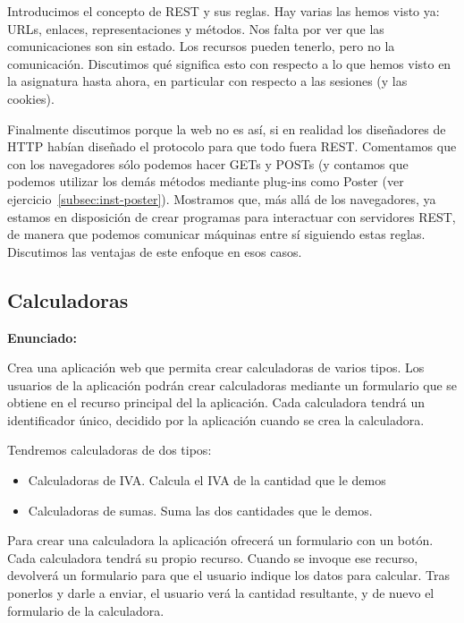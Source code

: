 Introducimos el concepto de REST y sus reglas. Hay varias las hemos visto ya: URLs, enlaces, representaciones y métodos. Nos falta por ver que las comunicaciones son sin estado. Los recursos pueden tenerlo, pero no la comunicación. Discutimos qué significa esto con respecto a lo que hemos visto en la asignatura hasta ahora, en particular con respecto a las sesiones (y las cookies).

Finalmente discutimos porque la web no es así, si en realidad los diseñadores de HTTP habían diseñado el protocolo para que todo fuera REST. Comentamos que con los navegadores sólo podemos hacer GETs y POSTs (y contamos que podemos utilizar los demás métodos mediante plug-ins como Poster (ver ejercicio~\ref{subsec:inst-poster}). Mostramos que, más allá de los navegadores, ya estamos en disposición de crear programas para interactuar con servidores REST, de manera que podemos comunicar máquinas entre sí siguiendo estas reglas. Discutimos las ventajas de este enfoque en esos casos.


\subsection{Calculadoras}
\label{subsec:calculadoras}

\textbf{Enunciado:}

Crea una aplicación web que permita crear calculadoras de varios tipos. Los usuarios  de la aplicación podrán crear calculadoras mediante un formulario que se obtiene en el recurso principal del la aplicación.  Cada calculadora tendrá un identificador único, decidido por la aplicación cuando se crea la calculadora.

Tendremos calculadoras de dos tipos:

\begin{itemize}
\item Calculadoras de IVA. Calcula el IVA de la cantidad que le demos
\item Calculadoras de sumas. Suma las dos cantidades que le demos.
\end{itemize}

Para crear una calculadora la aplicación ofrecerá un formulario con
un botón. Cada calculadora tendrá su propio recurso. Cuando se invoque ese recurso, devolverá un formulario para que el usuario indique los datos para calcular. Tras ponerlos y darle a enviar,  el usuario verá la cantidad resultante, y de nuevo el formulario de la calculadora.

